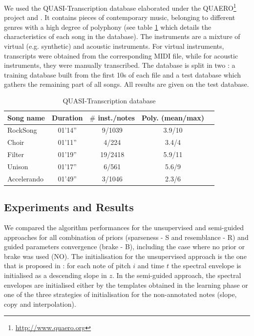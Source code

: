 \documentclass{article}
\begin{document}
We used the QUASI-Transcription database elaborated under the QUAERO\footnote{\url{http://www.quaero.org}} project and \cite{Fuentes2013_PhD}. It contains pieces of contemporary music, belonging to different genres with a high degree of polyphony (see table \ref{tab:quaero} which details the characteristics of each song in the database). The instruments are a mixture of virtual (e.g. synthetic) and acoustic instruments. For virtual instruments, transcripts were obtained from the corresponding MIDI file, while for acoustic instruments, they were manually transcribed.
The database is split in two : a training database built from the first 10s of each file and a test database  which gathers the remaining part of all songs. All results are given on the test database.

\begin{table}[htb]
\centering
\begin{tabular}{lcccc}
\\
\hline
Song name & Duration & $\#$ inst./notes & Poly. (mean/max) \\\hline
RockSong & 01'14'' & 9/1039 & 3.9/10 \\
Choir & 01'11'' & 4/224 & 3.4/4 \\
Filter & 01'19'' & 19/2418 & 5.9/11 \\
Unison & 01'17'' & 6/561 & 5.6/9 \\
Accelerando & 01'49'' & 3/1046 & 2.3/6 \\
\end{tabular}
\caption{QUASI-Transcription database}
\label{tab:quaero}
\end{table}

\vspace{0.3cm}

\subsection{Experiments and Results}


We compared the algorithm performances for the unsupervised and semi-guided approaches for all combination of priors (sparseness - S and resemblance - R) and guided parameters convergence (brake - B), including the case where no prior or brake was used (NO). The initialisation for the unsupervised approach is the one that is proposed in \cite{Fuentes2013_PhD}: for each note of pitch $i$ and time $t$ the spectral envelope is initialised as a descending slope in $z$. In the semi-guided approach, the spectral envelopes are initialised either by the templates obtained in the learning phase or one of the three strategies of initialisation for the non-annotated notes (slope, copy and interpolation).
\end{document}
